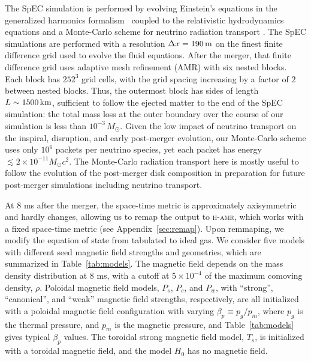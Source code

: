 \documentclass[twocolumn,dvipsnames]{aastex62}
\begin{document}
The SpEC simulation is performed by evolving Einstein's equations in the generalized harmonics formalism~\citep{Lindblom:2007} coupled to the relativistic hydrodynamics equations and a Monte-Carlo scheme for neutrino radiation transport \citep[see][for a description of the numerical methods in SpEC]{Duez:2008rb,Foucart:2013a,Foucart:2021mcb}. The SpEC simulations are performed with a resolution $\Delta x = 190\,{\rm m}$ on the finest finite difference grid used to evolve the fluid equations. After the merger, that finite difference grid uses adaptive mesh refinement (AMR) with six nested blocks. Each block has $252^3$ grid cells, with the grid spacing increasing by a factor of $2$ between nested blocks. Thus, the outermost block has sides of length $L\sim 1500\,{\rm km}$, sufficient to follow the ejected matter to the end of the SpEC simulation: the total mass loss at the outer boundary over the course of our simulation is less than $10^{-3}\,M_\odot$. Given the low impact of neutrino transport on the inspiral, disruption, and early post-merger evolution, our Monte-Carlo scheme uses only $10^6$ packets per neutrino species, yet each packet has energy $\lesssim 2 \times 10^{-11} M_\odot c^2$. The Monte-Carlo radiation transport here is mostly useful to follow the evolution of the post-merger disk composition in preparation for future post-merger simulations including neutrino transport.

At 8 ms after the merger, the space-time metric is approximately axisymmetric and hardly changes, allowing us to remap the output to \textsc{h-amr}, which works with a fixed space-time metric (see Appendix~\ref{sec:remap}). Upon remmaping, we modify the equation of state from tabulated to ideal gas. We consider five models with different seed magnetic field strengths and geometries, which are summarized in Table~\ref{tab:models}. The magnetic field depends on the mass density distribution at 8 ms, with a cutoff at $ 5\times 10^{-4} $ of the maximum comoving density, $ \rho $. Poloidal magnetic field models,  $P_s$, $P_c$, and $P_w$, with ``strong'', ``canonical'', and ``weak'' magnetic field strengths, respectively, are all initialized with a poloidal magnetic field configuration with varying $ \beta_p \equiv p_g/p_m $, where $ p_g $ is the thermal pressure, and $ p_m $ is the magnetic pressure, and Table~\ref{tab:models} gives typical $\beta_p$ values. The toroidal strong magnetic field model, $T_s$, is initialized with a toroidal magnetic field, and the model $H_0$ has no magnetic field. 
\end{document}
